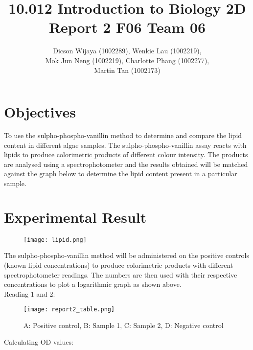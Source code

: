 \documentclass[11.5pt,a4paper]{IEEEtran}
\author{Dicson Wijaya (1002289), Wenkie Lau (1002219), \\ Mok Jun Neng (1002219), Charlotte Phang (1002277), \\ Martin Tan (1002173)}
\title{10.012 Introduction to Biology 2D \\ Report 2 F06 Team 06}
\begin{document}
	
	\maketitle
	
	\section{Objectives}
	To use the sulpho-phospho-vanillin method to determine and compare the lipid content in different algae samples. The sulpho-phospho-vanillin assay reacts with lipids to produce colorimetric products of different colour intensity. The products are analysed using a spectrophotometer and the results obtained will be matched against the graph below to determine the lipid content present in a particular sample.
	
	\section{Experimental Result}
	\begin{figure}[H]
		\begin{center}
			\texttt{[image: lipid.png]}
			\label{fig:lipid}
		\end{center}
	\end{figure}
    \vspace{-8mm} The sulpho-phospho-vanillin method will be administered on the positive controls (known lipid concentrations) to produce colorimetric products with different spectrophotometer readings. The numbers are then used with their respective concentrations to plot a logarithmic graph as shown above. \vspace{-2mm} \\
    
    Reading 1 and 2:
    \begin{figure}[H]
    	\begin{center}
    		\texttt{[image: report2\_table.png]}
    		\caption{A: Positive control, B: Sample 1, C: Sample 2, D: Negative control}
    		\label{fig:table}
    	\end{center}
    \end{figure}
	
    Calculating OD values:
\end{document}
